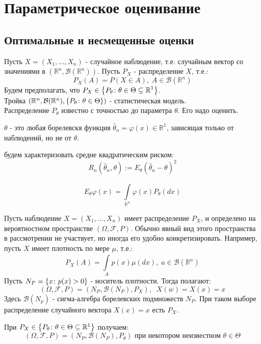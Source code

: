 \chapter{Параметрическое оценивание}\label{lec:4}

\section{Оптимальные и несмещенные оценки}\label{lec:4/sec:1}

Пусть $X = (X_1, \dots, X_n)$ - случайное наблюдение, т.е. случайным вектор со значениями в $(\mathbb{R}^n, \mathcal{B}(\mathbb{R}^n))$. Пусть $P_X$ - распределение $X$, т.е.:
$$P_X (A) = P(X \in A), \; A \in \mathcal{B}(\mathbb{R}^n)$$
Будем предполагать, что $\displaystyle P_X \in \left\{P_{\theta}\colon\theta \in \Theta \subseteq \mathbb{R}^1\right\}$.\\
Тройка $(\mathbb{R}^n, \mathcal{B}(\mathbb{R}^n), \left\{P_{\theta}\colon\theta \in \Theta\right\})$ - статистическая модель.\\
Распределение $P_{\theta}$ известно с точностью до параметра $\theta$. Его надо оценить.

\begin{definition}\label{lec:4/def:1}
  	 $\theta$ - это любая борелевскя функция $\hat{\theta}_n = \varphi(x) \in \mathbb{R}^1$, зависящая только от наблюдений, но не от $\theta$.
\end{definition}  

\begin{definition}\label{lec:4/def:2}
	 будем характеризовать средне квадратическим риском:
	$$R_n (\hat{\theta}_n, \theta) := E_{\theta} (\hat{\theta}_n - \theta)^2$$
\end{definition}

\begin{remem}\label{lec:4/remem:1}
	$$E_{\theta} \varphi(x) = \underset{\mathbb{R}^n}{\overset{}{\int}}\varphi(x) P_{\theta}(dx)$$
\end{remem}

\begin{remark}\label{lec:4/remark:1}
	Пусть наблюдение $X = (X_1, \dots, X_n)$ имеет распределение $P_X$, и определено на вероятностном пространстве $(\Omega, \mathcal{F}, P)$. Обычно явный вид этого пространства в рассмотрении не участвует, но иногда его удобно конкретизировать. Например, пусть $X$ имеет плотность по мере $\mu$, т.е.:
	$$P_X (A) = \underset{A}{\overset{}{\int}}p(x) \mu(dx), \; a\in \mathcal{B}(\mathbb{R}^n)$$
	Пусть $N_P = \left\{x\colon p(x) > 0\right\}$ - носитель плотности. Тогда полагают:
	$$(\Omega, \mathcal{F}, P) = (N_P, \mathcal{B}(N_P), P_X), \;\;X(w) = X(x) = x$$
	Здесь $\mathcal{B}(N_p)$ - сигма-алгебра борелевских подмножеств $N_P$. При таком выборе распределение случайного вектора $X(x) = x$ есть $P_X$.

	При $P_X \in \left\{P_{\theta}\colon\theta \in \Theta \subseteq \mathbb{R}^1\right\}$ получаем:
	$$(\Omega, \mathcal{F}, P) = (N_P, \mathcal{B}(N_P), P_{\theta}) \text{ при некотором неизвестном } \theta \in \Theta$$
\end{remark}

